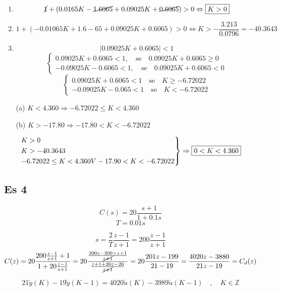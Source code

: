 \documentclass{article}
\begin{document}
\begin{enumerate}
    \item
        \[\cancel{1} + (0.0165K - \cancel{1.6065} + 0.09025K + \cancel{0.6065}) > 0 \Leftrightarrow \framebox{$K>0$}\]
    \item
        \[1 + (-0.01065K + 1.6-65 + 0.09025K + 0.6065) > 0 \Leftrightarrow K>-\frac{3.213}{0.0796} = -40.3643\]
    \item
        \[| 0.09025K + 0.6065| < 1 \]
        \[
            \begin{cases}
                0.09025K + 0.6065 < 1 ,\quad \text{se} \quad 0.09025K + 0.6065 \ge 0\\
                -0.09025K - 0.6065 < 1, \quad \text{se} \quad 0.09025K + 0.6065 < 0
            \end{cases}
        \]
        \[
            \begin{cases}
                0.09025K + 0.6065 < 1 \quad \text{se} \quad K\ge -6.72022\\
                -0.09025K - 0.065 < 1 \quad \text{se} \quad K < -6.72022
            \end{cases}
        \]
\end{enumerate}

\begin{itemize}
    \item[(a)] $ K < 4.360 \Rightarrow -6.72022 \le K < 4.360$
    \item[(b)] $ K > -17.80 \Rightarrow -17.80 < K < -6.72022$
\end{itemize}

\[
\begin{rcases}
    K> 0\\
    K > -40.3643\\
    -6.72022 \le K < 4.360 V -17.90 < K < -6.72022
\end{rcases} \Rightarrow \framebox{$0<K < 4.360$}
\]


\subsection{Es 4}
\[ C(s) = 20 \frac{s+1}{1+0.1s}\]
\[ T = 0.01s\]

\[s = \frac{2}{T} \frac{z-1}{z+1} = 200 \frac{z-1}{z+1}\]
\[ C(z) = 20 \frac{200\frac{z-1}{z+1} + 1}{1 + 20\frac{z-1}{z+1}} = 20 \frac{\frac{200z - 200 + z + 1}{\cancel{z+1}}}{\frac{z+1+20z - 20}{\cancel{z+1}}} = 20\frac{201z - 199}{21 -19} = \frac{4020z- 3880}{21z - 19} = C_d(z)\]

\[ 21\tilde{y}(K) - 19\tilde{y}(K-1) = 4020\tilde{u}(K) - 3989\tilde{u}(K-1)\quad,\quad K \in \mathbb{Z}\]
\end{document}
